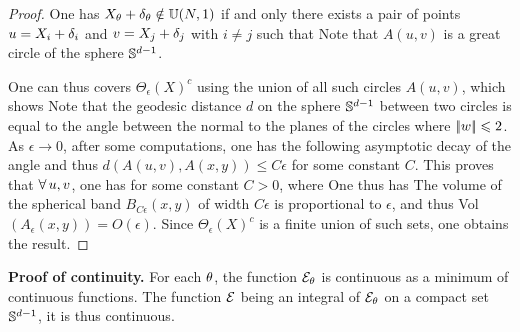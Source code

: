 \begin{proof}
	One has $X_\theta + \delta_\theta \notin \mathbb{U}(N,1)$ if and only there exists a pair of points
	$u=X_i+\delta_i$ and $v=X_j+\delta_j$ with $i \neq j$ such that
	Note that $A(u,v)$ is a great circle of the sphere $\mathbb{S}^{d-1}$. 
	 
	One can thus covers $\Theta_\epsilon(X)^c$ using the union of all such circles $A(u,v)$, which shows
	Note that the geodesic distance $d$ on the sphere $\mathbb{S}^{d-1}$ between two circles is equal to the angle between the normal to the planes of the circles
	where $|\!| w |\!|\leqslant 2$.
	As $\epsilon \rightarrow 0$, after some computations, 
	one has the following asymptotic decay of the angle
	and thus 
	$d(A(u,v),A(x,y)) \leq C \epsilon$ for some constant $C$. This proves that 
	$\forall \, u,v$, one has
	for some constant $C>0$, where
	One thus has 
	The volume of the spherical band $B_{C\epsilon}(x,y)$ of width $C\epsilon$ is proportional to $\epsilon$,
	and thus Vol$(A_\epsilon(x,y)) = O(\epsilon)$.
	Since $\Theta_\epsilon(X)^c$ is a finite union of such sets, one obtains the result.
\end{proof}

\noindent\textbf{Proof of continuity.} For each $\theta$, the function $\mathcal{E}_\theta$ is continuous as a minimum of continuous functions. The function $\mathcal{E}$ being an integral of $\mathcal{E}_\theta$ on a compact set $\mathbb{S}^{d-1}$, it is thus continuous.

\medskip
	

